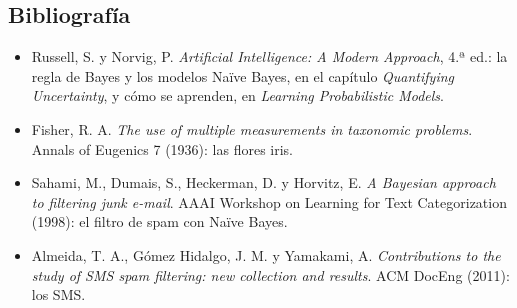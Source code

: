 \documentclass{article}
\begin{document}
\subsection*{Bibliografía}
\begin{itemize}\small\setlength{\itemsep}{1pt}
    \item Russell, S. y Norvig, P. \textit{Artificial Intelligence: A Modern Approach}, 4.ª ed.: la regla de Bayes y los modelos Naïve Bayes, en el capítulo \textit{Quantifying Uncertainty}, y cómo se aprenden, en \textit{Learning Probabilistic Models}.
    \item Fisher, R. A. \textit{The use of multiple measurements in taxonomic problems}. Annals of Eugenics 7 (1936): las flores iris.
    \item Sahami, M., Dumais, S., Heckerman, D. y Horvitz, E. \textit{A Bayesian approach to filtering junk e-mail}. AAAI Workshop on Learning for Text Categorization (1998): el filtro de spam con Naïve Bayes.
    \item Almeida, T. A., Gómez Hidalgo, J. M. y Yamakami, A. \textit{Contributions to the study of SMS spam filtering: new collection and results}. ACM DocEng (2011): los SMS.
\end{itemize}
\end{document}
